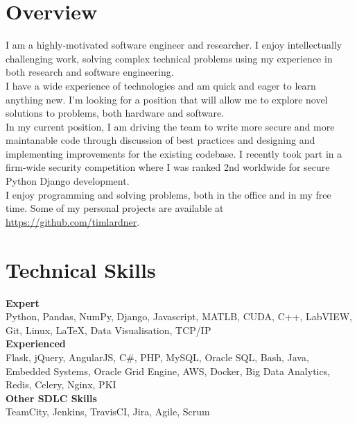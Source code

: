 
\section*{Overview}
I am a highly-motivated software engineer and researcher. I enjoy intellectually challenging work, solving complex technical problems using my experience in both research and software engineering.\\[5pt]

I have a wide experience of technologies and am quick and eager to learn anything new. I'm looking for a position that will allow me to explore novel solutions to problems, both hardware and software.\\[5pt]

In my current position, I am driving the team to write more secure and more maintanable code through discussion of best practices and designing and implementing improvements for the existing codebase. I recently took part in a firm-wide security competition where I was ranked 2nd worldwide for secure Python Django development.\\[5pt]

I enjoy programming and solving problems, both in the office and in my free time. Some of my personal projects are available at \url{https://github.com/timlardner}.

\section*{Technical Skills}
\textbf{Expert}\\
Python, Pandas, NumPy, Django, Javascript, MATLB, CUDA, C++, LabVIEW, Git, Linux, LaTeX, Data Visualisation, TCP/IP\\[10pt]
\textbf{Experienced}\\
Flask, jQuery, AngularJS, C\#, PHP, MySQL, Oracle SQL, Bash, Java, Embedded Systems, Oracle Grid Engine, AWS, Docker, Big Data Analytics, Redis, Celery, Nginx, PKI\\[10pt]
\textbf{Other SDLC Skills}\\
TeamCity, Jenkins, TravisCI, Jira, Agile, Scrum\\[5pt] 